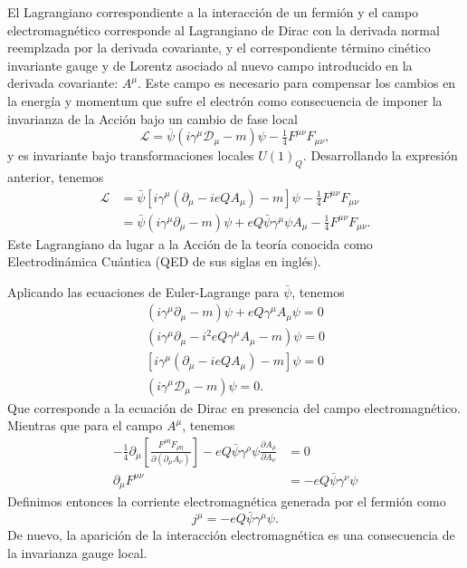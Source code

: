 El Lagrangiano correspondiente a la interacción de un fermión y el campo electromagnético corresponde al Lagrangiano de Dirac con la derivada normal reemplzada por la derivada covariante, y el correspondiente término cinético invariante gauge y de Lorentz asociado al nuevo campo introducido en la derivada covariante: $A^\mu$. Este campo es necesario para compensar los cambios en la energía y momentum que sufre el electrón como consecuencia de imponer la invarianza de la Acción bajo un cambio de fase local 
\begin{equation}
  \label{eq:201qft}
  \mathcal{L}=\overline{\psi}\left(i\gamma^\mu\mathcal{D}_\mu-m\right)\psi -\tfrac{1}{4}F^{\mu\nu}F_{\mu\nu},
\end{equation}
y es invariante bajo transformaciones locales $U(1)_Q$. Desarrollando la expresión anterior, tenemos
\begin{align}
    \mathcal{L}&=\bar{\psi}\left[i\gamma^\mu\left(\partial_\mu-ieQA_\mu\right)-m\right]\psi -\tfrac{1}{4}F^{\mu\nu}F_{\mu\nu}\nonumber\\
    &=\bar{\psi}\left(i\gamma^\mu\partial_\mu-m\right)\psi+eQ\bar{\psi}\gamma^\mu\psi A_\mu -\tfrac{1}{4}F^{\mu\nu}F_{\mu\nu}.
\end{align}
Este Lagrangiano da lugar a la Acción de la teoría conocida como Electrodinámica Cuántica (QED de sus siglas en inglés).

Aplicando las ecuaciones de Euler-Lagrange para $\bar{\psi}$, tenemos
\begin{align}
  (i\gamma^\mu\partial_\mu-m)\psi+eQ\gamma^\mu A_\mu\psi=0\nonumber\\
  (i\gamma^\mu\partial_\mu-i^2eQ\gamma^\mu A_\mu-m)\psi=0\nonumber\\
  [i\gamma^\mu(\partial_\mu-ieQA_\mu)-m]\psi=0\nonumber\\
  (i\gamma^\mu\mathcal{D}_\mu-m)\psi=0.
\end{align}
Que corresponde a la ecuación de Dirac en presencia del campo electromagnético. Mientras que para el campo $A^\mu$, tenemos
\begin{align}
  -\frac{1}{4}\partial_\mu\left[\frac{F^{\rho\eta}F_{\rho\eta}}{\partial\left(\partial_\mu A_\nu\right)}\right]-eQ\bar{\psi}\gamma^\rho\psi\frac{\partial A_\rho}{\partial A_\nu}&=0\nonumber\\
  \partial_\mu F^{\mu\nu}&=-eQ\bar{\psi}\gamma^\nu\psi
\end{align}
Definimos entonces la corriente electromagnética generada por el fermión como
\begin{equation}
  \label{eq:222qft}
  j^\mu=-eQ\bar{\psi}\gamma^\mu\psi.
\end{equation}
De nuevo, la aparición de la interacción electromagnética es una consecuencia de la invarianza gauge local. 

